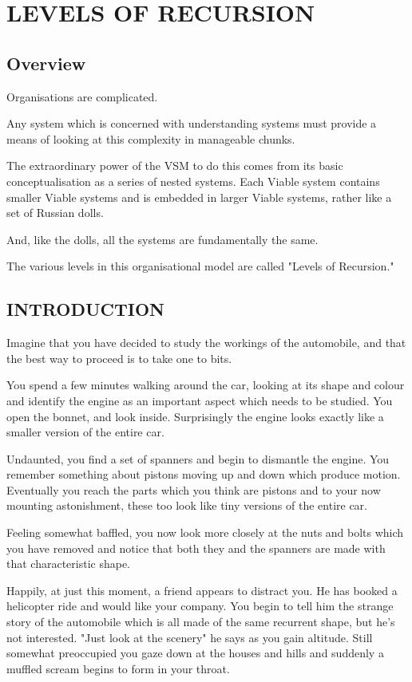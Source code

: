 \chapter{LEVELS OF RECURSION}\label{LEVELS OF RECURSION}
\section*{Overview}
Organisations are complicated.

Any system which is concerned with understanding systems must provide a means of looking at this complexity in manageable chunks.

The extraordinary power of the VSM to do this comes from its basic conceptualisation as a series of nested systems. Each Viable system contains smaller Viable systems and is embedded in larger Viable systems, rather like a set of Russian dolls.

And, like the dolls, all the systems are fundamentally the same.

The various levels in this organisational model are called "Levels of Recursion."

\section*{INTRODUCTION}
Imagine that you have decided to study the workings of the automobile, and that the best way to proceed is to take one to bits.

You spend a few minutes walking around the car, looking at its shape and colour and identify the engine as an important aspect which needs to be studied. You open the bonnet, and look inside. Surprisingly the engine looks exactly like a smaller version of the entire car.

Undaunted, you find a set of spanners and begin to dismantle the engine. You remember something about pistons moving up and down which produce motion. Eventually you reach the parts which you think are pistons and to your now mounting astonishment, these too look like tiny versions of the entire car.

Feeling somewhat baffled, you now look more closely at the nuts and bolts which you have removed and notice that both they and the spanners are made with that characteristic shape.

Happily, at just this moment, a friend appears to distract you. He has booked a helicopter ride and would like your company. You begin to tell him the strange story of the automobile which is all made of the same recurrent shape, but he's not interested. "Just look at the scenery" he says as you gain altitude. Still somewhat preoccupied you gaze down at the houses and hills and suddenly a muffled scream begins to form in your throat.

